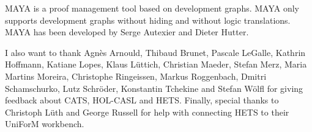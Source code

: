 \documentclass{article}
\newcommand{\normalTEXTSC}[2]{{#1\scriptsize#2}}
\newcommand     {\MAYA}{\normalTEXTSC{M}{AYA}\xspace}
\newcommand     {\Hets}{\normalTEXTSC{H}{ETS}\xspace}
\newcommand     {\Cats}{\normalTEXTSC{C}{ATS}\xspace}
\begin{document}
\MAYA \cite{Autexier:2002:IHD,AutexierEtal02} is a proof management
tool based on development graphs.  \MAYA only supports development
graphs without hiding and without logic translations.  \MAYA has been
developed by Serge Autexier and Dieter Hutter.

I also want to thank Agn\`es Arnould, Thibaud Brunet, Pascale LeGalle,
Kathrin Hoffmann, Katiane Lopes, Klaus L\"uttich, Christian Maeder,
Stefan Merz, Maria Martins Moreira, Christophe 
Ringeissen, Markus Roggenbach, Dmitri Schamschurko, Lutz Schr\"oder,
Konstantin Tchekine and Stefan W\"olfl 
for giving feedback about \Cats, HOL-CASL and \Hets. Finally,
special thanks to Christoph L\"uth and George Russell
for help with connecting \Hets to their UniForM workbench.




\end{document}
